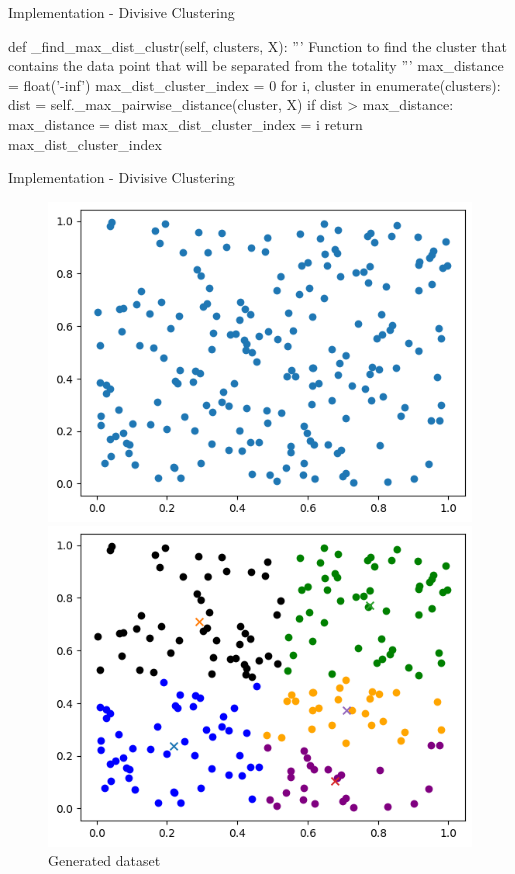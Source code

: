 \documentclass{beamer}
\begin{document}
\begin{frame}[fragile]{Implementation - Divisive Clustering}
    \begin{python}
def _find_max_dist_clustr(self, clusters, X):
    '''
    Function to find the cluster that contains the 
    data point that will be separated from the
    totality  
    '''
    max_distance = float('-inf')
    max_dist_cluster_index = 0
    for i, cluster in enumerate(clusters):
    dist = self._max_pairwise_distance(cluster, X)
    if dist > max_distance:
        max_distance = dist
        max_dist_cluster_index = i
        return max_dist_cluster_index
    \end{python}
\end{frame}
 

\begin{frame}{Implementation - Divisive Clustering}
    \begin{figure}
    \centering
    \begin{minipage}{.4\textwidth}
      \centering
      \includegraphics[width=\textwidth]{data_generation.png}
      \caption{Generated dataset}
    \end{minipage}
    \hfill
    \begin{minipage}{.4\textwidth}
      \centering
      \includegraphics[width=\textwidth]{divisive_hierarchical_output.png}

\end{minipage}
\end{figure}
\end{frame}
\end{document}
